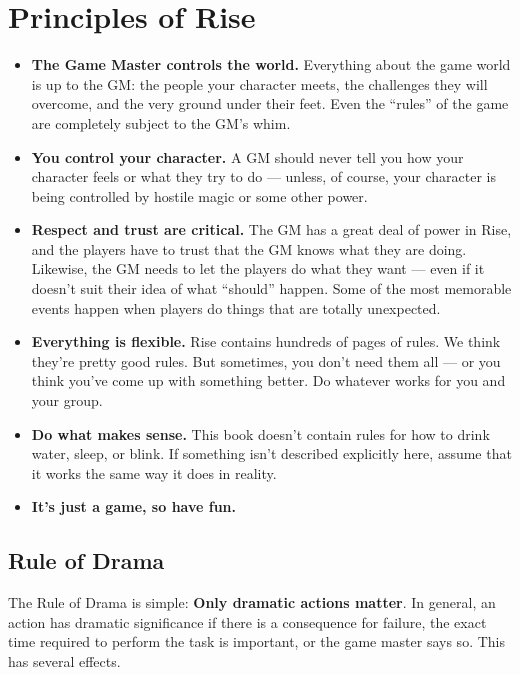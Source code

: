 \section{Principles of Rise}

  \begin{itemize}
    \item \textbf{The Game Master controls the world.} Everything about the game world is up to the GM\@: the people your character meets, the challenges they will overcome, and the very ground under their feet.
      Even the ``rules'' of the game are completely subject to the GM's whim.
    \item \textbf{You control your character.} A GM should never tell you how your character feels or what they try to do --- unless, of course, your character is being controlled by hostile magic or some other power.
    \item \textbf{Respect and trust are critical.} The GM has a great deal of power in Rise, and the players have to trust that the GM knows what they are doing.
      Likewise, the GM needs to let the players do what they want --- even if it doesn't suit their idea of what ``should'' happen.
      Some of the most memorable events happen when players do things that are totally unexpected.
    \item \textbf{Everything is flexible.} Rise contains hundreds of pages of rules.
      We think they're pretty good rules.
      But sometimes, you don't need them all --- or you think you've come up with something better.
      Do whatever works for you and your group.
    \item \textbf{Do what makes sense.} This book doesn't contain rules for how to drink water, sleep, or blink.
      If something isn't described explicitly here, assume that it works the same way it does in reality.
    \item \textbf{It's just a game, so have fun.}
  \end{itemize}

  \subsection{Rule of Drama}

    The Rule of Drama is simple: \textbf{Only dramatic actions matter}.
    In general, an action has dramatic significance if there is a consequence for failure, the exact time required to perform the task is important, or the game master says so.
    This has several effects.

